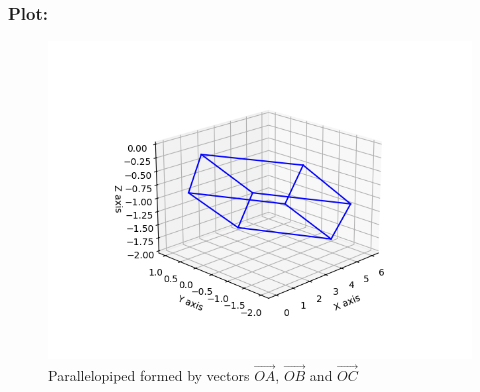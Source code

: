 \documentclass{beamer}
\begin{document}
\begin{frame}
    \frametitle{Plot: }
    \begin{figure}[h!]
        \centering
        \includegraphics[width=0.8\columnwidth]{../figs/plot.png}
        \caption{Parallelopiped formed by vectors $\vec{OA}$, $\vec{OB}$ and $\vec{OC}$}
        \label{fig:2.10.29}
    \end{figure}
\end{frame}
\end{document}

